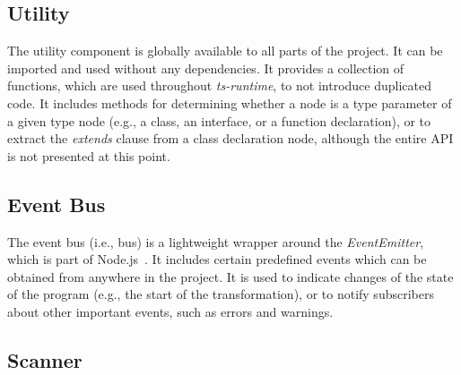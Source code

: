 \subsection{Utility}
\label{sec:utility}

The utility component is globally available to all parts of the project. It can be imported and used without any dependencies. It provides a collection of functions, which are used throughout \emph{ts-runtime}, to not introduce duplicated code. It includes methods for determining whether a node is a type parameter of a given type node (e.g., a class, an interface, or a function declaration), or to extract the \emph{extends} clause from a class declaration node, although the entire API is not presented at this point.

\subsection{Event Bus}
\label{sec:bus}

The event bus (i.e., bus) is a lightweight wrapper around the \emph{EventEmitter}, which is part of Node.js~\cite{Node:API:Events}. It includes certain predefined events which can be obtained from anywhere in the project. It is used to indicate changes of the state of the program (e.g., the start of the transformation), or to notify subscribers about other important events, such as errors and warnings.

\enlargethispage{1\baselineskip}
\subsection{Scanner}
\label{sec:scanner}

